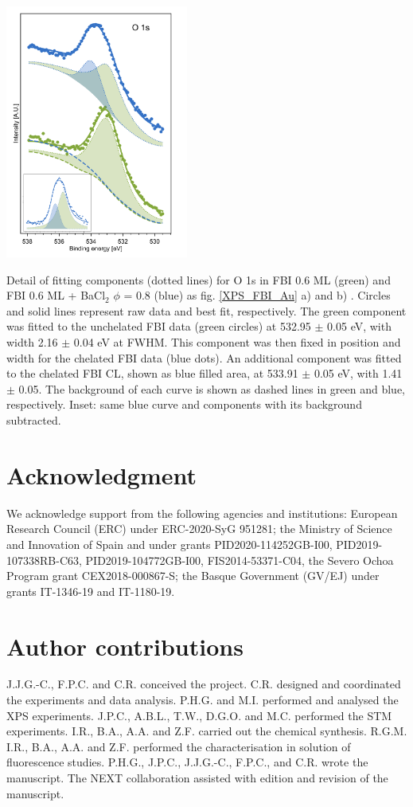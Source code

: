 \documentclass[aps,prl,reprint,longbibliography,superscriptaddress, english]{revtex4-1}
\begin{document}
\begin{center}
	\includegraphics[width=0.45\textwidth]{figures/fig6_fit.pdf}
	\captionsetup{type=figure} %
	\caption{\label{XPS_fits} Detail of fitting components (dotted lines) for O 1s in FBI 0.6 ML (green) and FBI 0.6 ML + BaCl$_2$ $\phi$ = 0.8 (blue) as fig. \ref{XPS_FBI_Au} a) and b) . Circles and solid lines represent raw data and best fit, respectively. The green component was fitted to the unchelated FBI data (green circles) at 532.95 $\pm$ 0.05 eV, with width 2.16 $\pm$ 0.04 eV at FWHM. This component was then fixed in position and width for the chelated FBI data (blue dots). An additional component was fitted to the chelated FBI CL, shown as blue filled area, at 533.91 $\pm$ 0.05 eV,  with 1.41 $\pm$ 0.05. The background of each curve is shown as dashed lines in green and blue, respectively. Inset: same blue curve and components with its background subtracted.}
\end{center}


\section{Acknowledgment}
We acknowledge support from the following agencies and institutions: European Research Council (ERC) under ERC-2020-SyG 951281; the Ministry of Science and Innovation of Spain and under grants PID2020-114252GB-I00, PID2019-107338RB-C63, PID2019-104772GB-I00, FIS2014-53371-C04, the Severo Ochoa Program grant CEX2018-000867-S; the Basque Government (GV/EJ) under grants IT-1346-19 and IT-1180-19. 

\section{Author contributions}
J.J.G.-C., F.P.C. and C.R. conceived the project. C.R. designed and coordinated the experiments and data analysis. P.H.G. and M.I. performed and analysed the XPS experiments. J.P.C., A.B.L., T.W., D.G.O. and M.C. performed the STM experiments. I.R., B.A., A.A. and Z.F. carried out the chemical synthesis. R.G.M. I.R., B.A., A.A. and Z.F. performed the characterisation in solution of fluorescence studies. P.H.G., J.P.C., J.J.G.-C., F.P.C., and C.R. wrote the manuscript. The NEXT collaboration assisted with edition and revision of the manuscript. 

 

\end{document}
